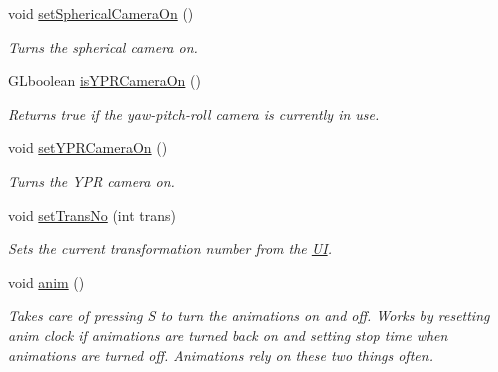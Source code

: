 \begin{DoxyCompactItemize}
\mbox{\label{class_graphics_engine_a82227c52191595cf7ca7aaea82396a01}} 
void \hyperlink{class_graphics_engine_a82227c52191595cf7ca7aaea82396a01}{set\+Spherical\+Camera\+On} ()
\begin{DoxyCompactList}\small\item\em Turns the spherical camera on. \end{DoxyCompactList}\item 
G\+Lboolean \hyperlink{class_graphics_engine_a8ed6b779b8696620241ba701afd6de67}{is\+Y\+P\+R\+Camera\+On} ()
\begin{DoxyCompactList}\small\item\em Returns true if the yaw-\/pitch-\/roll camera is currently in use. \end{DoxyCompactList}\item 
\mbox{\label{class_graphics_engine_a322229c8ad08ee37b26c047761ca7b80}} 
void \hyperlink{class_graphics_engine_a322229c8ad08ee37b26c047761ca7b80}{set\+Y\+P\+R\+Camera\+On} ()
\begin{DoxyCompactList}\small\item\em Turns the Y\+PR camera on. \end{DoxyCompactList}\item 
void \hyperlink{class_graphics_engine_a20b5121989df95fd4deaefae6e81a168}{set\+Trans\+No} (int trans)
\begin{DoxyCompactList}\small\item\em Sets the current transformation number from the \hyperlink{class_u_i}{UI}. \end{DoxyCompactList}\item 
\mbox{\label{class_graphics_engine_a59db7ebc8df55b658a856e335814f8ee}} 
void \hyperlink{class_graphics_engine_a59db7ebc8df55b658a856e335814f8ee}{anim} ()
\begin{DoxyCompactList}\small\item\em Takes care of pressing S to turn the animations on and off. Works by resetting anim clock if animations are turned back on and setting stop time when animations are turned off. Animations rely on these two things often. \end{DoxyCompactList}\item 
\mbox{\label{class_graphics_engine_a08fa5ea5485b0bab2d902dd71ac995d9}} 

\end{DoxyCompactItemize}
